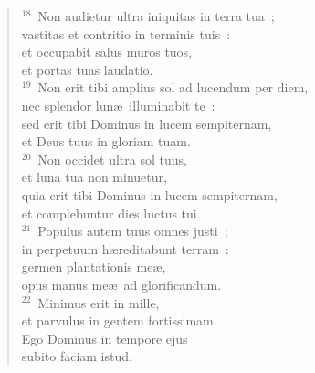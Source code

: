 \begin{flushleft}
\begin{verse}
${}^{18}$~Non audietur ultra iniquitas in terra tua~;\\ vastitas et contritio in terminis tuis~:\\ et occupabit salus muros tuos,\\ et portas tuas laudatio.\\
${}^{19}$~Non erit tibi amplius sol ad lucendum per diem,\\ nec splendor lun\ae\ illuminabit te~:\\ sed erit tibi Dominus in lucem sempiternam,\\ et Deus tuus in gloriam tuam.\\
${}^{20}$~Non occidet ultra sol tuus,\\ et luna tua non minuetur,\\ quia erit tibi Dominus in lucem sempiternam,\\ et complebuntur dies luctus tui.\\
${}^{21}$~Populus autem tuus omnes justi~;\\ in perpetuum h\ae reditabunt terram~:\\ germen plantationis me\ae ,\\ opus manus me\ae\ ad glorificandum.\\
${}^{22}$~Minimus erit in mille,\\ et parvulus in gentem fortissimam.\\ Ego Dominus in tempore ejus\\ subito faciam istud.\end{verse}\end{flushleft}


